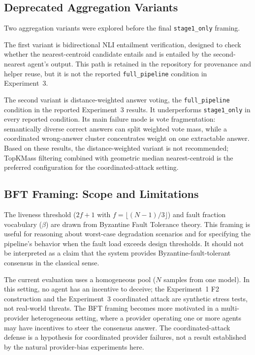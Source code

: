 \documentclass[11pt]{article}
\begin{document}
\subsection{Deprecated Aggregation Variants}
\label{sec:deprecated}

Two aggregation variants were explored before the final \texttt{stage1\_only}
framing.

The first variant is bidirectional NLI entailment verification, designed to check
whether the nearest-centroid candidate entails and is entailed by the
second-nearest agent's output. This path is retained in the repository for
provenance and helper reuse, but it is not the reported \texttt{full\_pipeline}
condition in Experiment~3.

The second variant is distance-weighted answer voting, the
\texttt{full\_pipeline} condition in the reported Experiment~3 results. It
underperforms \texttt{stage1\_only}
in every reported condition. Its main failure mode is vote fragmentation:
semantically diverse correct answers can split weighted vote mass, while a
coordinated wrong-answer cluster concentrates weight on one extractable answer.
Based on these results, the distance-weighted variant is not recommended;
TopKMass filtering combined with geometric median nearest-centroid is the
preferred configuration for the coordinated-attack setting.

\subsection{BFT Framing: Scope and Limitations}
\label{sec:bft}

The liveness threshold ($2f+1$ with $f = \lfloor(N-1)/3\rfloor$) and fault
fraction vocabulary ($\beta$) are drawn from Byzantine Fault Tolerance theory.
This framing is useful for reasoning about worst-case degradation scenarios and
for specifying the pipeline's behavior when the fault load exceeds design
thresholds. It should not be interpreted as a claim that the system provides
Byzantine-fault-tolerant consensus in the classical sense.

The current evaluation uses a homogeneous pool ($N$ samples from one model). In
this setting, no agent has an incentive to deceive; the Experiment~1 F2
construction and the Experiment~3 coordinated attack are synthetic stress tests,
not real-world threats. The BFT framing becomes more
motivated in a multi-provider heterogeneous setting, where a provider operating
one or more agents may have incentives to steer the consensus answer. The
coordinated-attack defense is a hypothesis for coordinated provider failures, not
a result established by the natural provider-bias experiments here.
\end{document}
